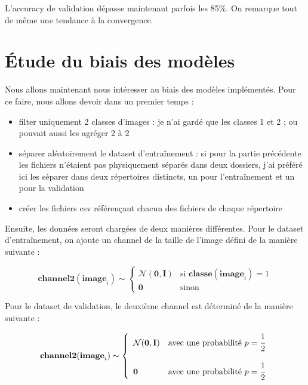 \documentclass{report}
\begin{document}
L'accuracy de validation dépasse maintenant parfois les 85\%. On remarque tout de même une tendance
à la convergence.

\chapter{Étude du biais des modèles}

Nous allons maintenant nous intéresser au biais des modèles implémentés. Pour ce faire, nous allons 
devoir dans un premier temps :
\begin{itemize}
    \item filter uniquement 2 classes d'images : je n'ai gardé que les classes 1 et 2 ; ou pouvait aussi
        les agréger 2 à 2
    \item séparer aléatoirement le dataset d'entraînement : si pour la partie précédente les fichiers
        n'étaient pas physiquement séparés dans deux dossiers, j'ai préféré ici les séparer dans deux
        répertoires distincts, un pour l'entraînement et un pour la validation
    \item créer les fichiers csv référençant chacun des fichiers de chaque répertoire
\end{itemize}

Ensuite, les données seront chargées de deux manières différentes. Pour le dataset d'entraînement, on 
ajoute un channel de la taille de l'image défini de la manière suivante :

\begin{center}
    \begin{equation*}
    \textbf{channel2}(\textbf{image}_i) \sim
    \displaystyle\left\{
    \begin{array}{ll}
        \mathcal{N}(\textbf{0},\textbf{I}) & \text{si } \textbf{classe}(\textbf{image}_i) = 1 \\[15pt]
        \textbf{0} & \text{sinon}
    \end{array}
    \right.
    \end{equation*}
\end{center}

Pour le dataset de validation, le deuxième channel est déterminé de la manière suivante :

\begin{center}
    \begin{equation*}
    \textbf{channel2}(\textbf{image}_i) \sim
    \displaystyle\left\{
    \begin{array}{ll}
        \mathcal{N}(\textbf{0},\textbf{I}) & \text{avec une probabilité } p = \cfrac{1}{2} \\[15pt]
        \textbf{0} & \text{avec une probabilité } p = \cfrac{1}{2}
    \end{array}
    \right.
    \end{equation*}
\end{center}
\end{document}
